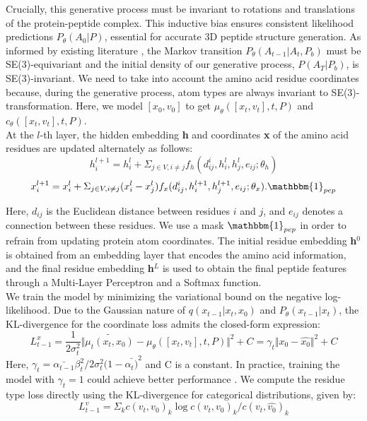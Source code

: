 Crucially, this generative process must be invariant to rotations and translations of the protein-peptide complex. This inductive bias ensures consistent likelihood predictions $P_{\theta}(A_0|P)$, essential for accurate 3D peptide structure generation. As informed by existing literature \cite{kohler2020equivariant, xu2022geodiff}, the Markov transition $P_\theta(A_{t-1} |A_t, P_b)$ must be SE(3)-equivariant and the initial density of our generative process, $P(A_T|P_b)$, is SE(3)-invariant. We need to take into account the amino acid residue coordinates because, during the generative process, atom types are always invariant to SE(3)-transformation. Here, we model $[x_0, v_0]$ to get $\mu_{\theta}([x_t, v_t], t, P)$ and $c_\theta([x_t, v_t], t, P)$.  \\

At the $l$-th layer, the hidden embedding \textbf{h} and coordinates \textbf{x} of the amino acid residues are updated alternately as follows:
$$h_i^{l+1} = h_i^l + \Sigma_{j \in V, i\neq j}  f_h(d_{ij}^i, h_i^l, h_j^l, e_{ij}; \theta_h)$$
$$x_i^{l+1} = x_i^l + \Sigma_{j \in V, i\neq j} (x_i^l - x_j^l)  f_x(d_{ij}^i, h_i^{l+1}, h_j^{l+1}, e_{ij}; \theta_x).\mathbbm{1}_{pep}$$

Here, $d_{ij}$ is the Euclidean distance between residues $i$ and $j$, and $e_{ij}$ denotes a connection between these residues. We use a mask $\mathbbm{1}_{pep}$ in order to refrain from updating protein atom coordinates. The initial residue embedding \textbf{h$^0$} is obtained from an embedding layer that encodes the amino acid information, and the final residue embedding \textbf{h$^L$} is used to obtain the final peptide features through a Multi-Layer Perceptron and a Softmax function. \\

We train the model by minimizing the variational bound on the negative log-likelihood. Due to the Gaussian nature of $q(x_{t-1}|x_t, x_0)$ and $P_{\theta}(x_{t-1}|x_t)$, the KL-divergence for the coordinate loss admits the closed-form expression:
$$L_{t-1}^x = \frac{1}{2\sigma_t^2} \Vert{\tilde{\mu_t(x_t, x_0)} - \mu_{\theta}([x_t, v_t], t, P)}\Vert^2 + C = \gamma_t\Vert{x_0 - \hat{x_0}}\Vert^2 + C$$
Here, $\gamma_t = \bar{\alpha_{t-1}}\beta_t^2/2\sigma_t^2(1-\bar{\alpha_t)}^2$ and C is a constant. In practice, training the model with $\gamma_t = 1$ could achieve better performance \cite{ho2020denoising}. We compute the residue type loss directly using the KL-divergence for categorical distributions, given by:
$$L_{t-1}^v = \Sigma_{k} c(v_t, v_0)_{k} \log c(v_t, v_0)_{k}/c(v_t, \hat{v_0})_{k}$$

